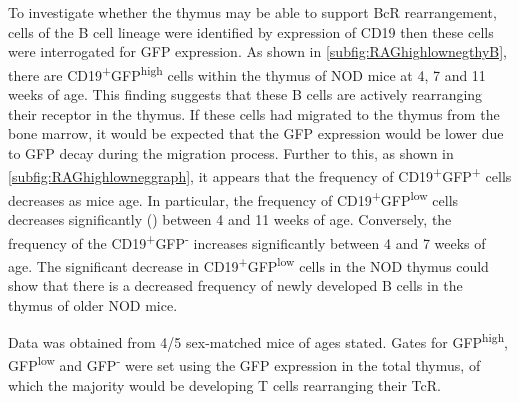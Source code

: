 To investigate whether the thymus may be able to support BcR rearrangement, cells of the B cell lineage were identified by expression of CD19 then these cells were interrogated for GFP expression.
As shown in \cref{subfig:RAGhighlownegthyB}, there are CD19\textsuperscript{+}GFP\textsuperscript{high} cells within the thymus of NOD mice at 4, 7 and 11 weeks of age.
This finding suggests that these B cells are actively rearranging their receptor in the thymus.
If these cells had migrated to the thymus from the bone marrow, it would be expected that the GFP expression would be lower due to GFP decay during the migration process.
Further to this, as shown in \cref{subfig:RAGhighlowneggraph}, it appears that the frequency of CD19\textsuperscript{+}GFP\textsuperscript{+} cells decreases as mice age.
In particular, the frequency of CD19\textsuperscript{+}GFP\textsuperscript{low} cells decreases significantly () between 4 and 11 weeks of age.
Conversely, the frequency of the CD19\textsuperscript{+}GFP\textsuperscript{-} increases significantly between 4 and 7 weeks of age.
The significant decrease in CD19\textsuperscript{+}GFP\textsuperscript{low} cells in the NOD thymus could show that there is a decreased frequency of newly developed B cells in the thymus of older NOD mice.

Data was obtained from 4/5 sex-matched mice of ages stated.
Gates for GFP\textsuperscript{high}, GFP\textsuperscript{low} and GFP\textsuperscript{-} were set using the GFP expression in the total thymus, of which the majority would be developing T cells rearranging their TcR.



